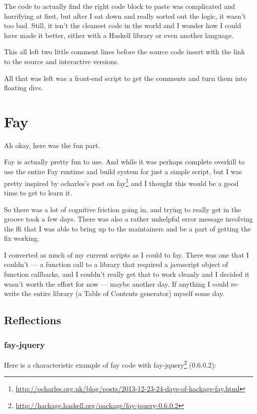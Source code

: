 \documentclass[]{article}
\renewcommand{\href}[2]{#2\footnote{\url{#1}}}
\begin{document}
The code to actually find the right code block to paste was complicated and
horrifying at first, but after I sat down and really sorted out the logic, it
wasn't too bad. Still, it isn't the cleanest code in the world and I wonder how
I could have made it better, either with a Haskell library or even another
language.

This all left two little comment lines before the source code insert with the
link to the source and interactive versions.

All that was left was a front-end script to get the comments and turn them into
floating divs.

\section{Fay}\label{fay}

Ah okay, here was the fun part.

Fay is actually pretty fun to use. And while it was perhaps complete overkill to
use the entire Fay runtime and build system for just a simple script, but I was
pretty inspired by
\href{http://ocharles.org.uk/blog/posts/2013-12-23-24-days-of-hackage-fay.html}{ocharles's
post on fay} and I thought this would be a good time to get to learn it.

So there was a lot of cognitive friction going in, and trying to really get in
the groove took a few days. There was also a rather unhelpful error message
involving the ffi that I was able to bring up to the maintainers and be a part
of getting the fix working.

I converted as much of my current scripts as I could to fay. There was one that
I couldn't --- a function call to a library that required a javascript object of
function callbacks, and I couldn't really get that to work cleanly and I decided
it wasn't worth the effort for now --- maybe another day. If anything I could
re-write the entire library (a Table of Contents generator) myself some day.

\subsection{Reflections}\label{reflections-1}

\subsubsection{fay-jquery}\label{fay-jquery}

Here is a characteristic example of fay code with
\href{http://hackage.haskell.org/package/fay-jquery-0.6.0.2}{fay-jquery}
(0.6.0.2):
\end{document}
